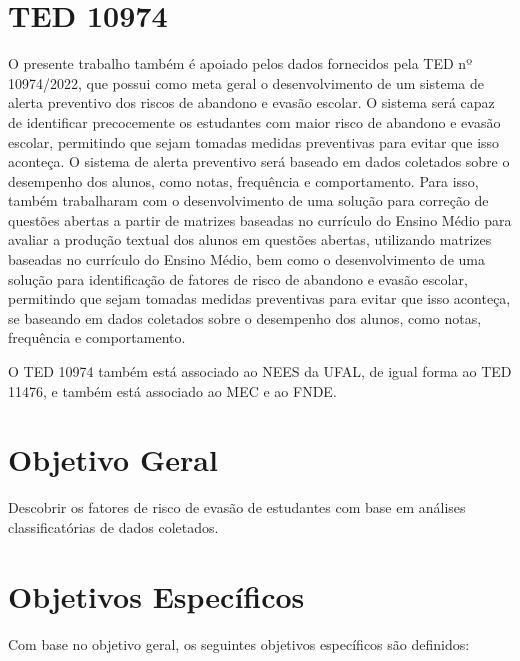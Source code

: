 \section{TED 10974}

O presente trabalho também é apoiado pelos dados fornecidos pela TED nº 10974/2022, que possui como meta geral o desenvolvimento de um sistema de alerta preventivo dos riscos de abandono e evasão escolar. O sistema será capaz de identificar precocemente os estudantes com maior risco de abandono e evasão escolar, permitindo que sejam tomadas medidas preventivas para evitar que isso aconteça. O sistema de alerta preventivo será baseado em dados coletados sobre o desempenho dos alunos, como notas, frequência e comportamento. Para isso, também trabalharam com o desenvolvimento de uma solução para correção de questões abertas a partir de matrizes baseadas no currículo do Ensino Médio para avaliar a produção textual dos alunos em questões abertas, utilizando matrizes baseadas no currículo do Ensino Médio, bem como o desenvolvimento de uma solução para identificação de fatores de risco de abandono e evasão escolar, permitindo que sejam tomadas medidas preventivas para evitar que isso aconteça, se baseando em dados coletados sobre o desempenho dos alunos, como notas, frequência e comportamento.

O TED 10974 também está associado ao NEES da UFAL, de igual forma ao TED 11476, e também está associado ao MEC e ao FNDE.

\section{Objetivo Geral}

Descobrir os fatores de risco de evasão de estudantes com base em análises classificatórias de dados coletados. 


\section{Objetivos Específicos}

Com base no objetivo geral, os seguintes objetivos específicos são definidos:


